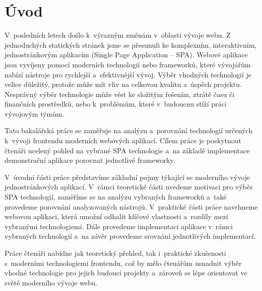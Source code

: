 \section*{Úvod}

V~posledních letech došlo k~výrazným změnám v~oblasti vývoje webu. 
Z jednoduchých statických stránek jsme se přesunuli ke komplexním, interaktivním, jednostránkovým aplikacím (Single Page Application -- SPA). 
Webové aplikace jsou vyvíjeny pomocí moderních technologií nebo frameworků, které vývojářům nabízí nástroje pro rychlejší a~efektivnější vývoj. 
Výběr vhodných technologií je velice důležitý, protože může mít vliv na celkovou kvalitu a~úspěch projektu. 
Nesprávný výběr technologie může vést ke složitým řešením, ztrátě času či finančních prostředků, nebo k~problémům, které v~budoucnu stíží práci vývojovým týmům.

Tato bakalářská práce se zaměřuje na analýzu a~porovnání technologií určených k~vývoji frontendu moderních webových aplikací. 
Cílem práce je poskytnout čtenáři ucelený pohled na vybrané SPA technologie a~na základě implementace demonstrační aplikace porovnat jednotlivé frameworky.

V~úvodní části práce představíme základní pojmy týkající se moderního vývoje jednostránkových aplikací. 
V~rámci teoretické části uvedeme motivaci pro výběr SPA technologií, zaměříme se na analýzu vybraných frameworků a~také provedeme porovnání analyzovaných nástrojů. 
V~praktické části práce navrhneme webovou aplikaci, která umožní odhalit klíčové vlastnosti a~rozdíly mezi vybranými technologiemi. 
Dále provedeme implementaci aplikace v~rámci vybraných technologií a~na závěr provedeme srovnání jednotlivých implementací.

Práce čtenáři nabídne jak teoretický přehled, tak i~praktické zkušenosti s~moderními technologiemi frontendu, 
což by mělo čtenářům usnadnit výběr vhodné technologie pro jejich budoucí projekty a~zároveň se lépe orientovat ve světě moderního vývoje webu.


